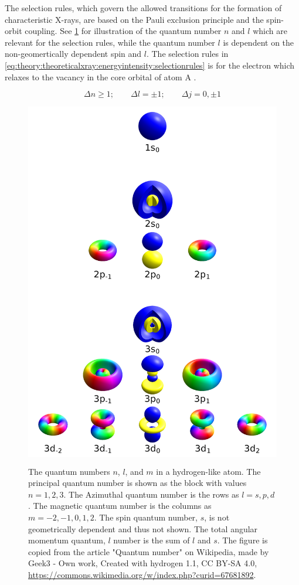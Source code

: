The selection rules, which govern the allowed transitions for the formation of characteristic X-rays, are based on the Pauli exclusion principle and the spin-orbit coupling.
See \cref{fig:theory:theoreticalxray:energyintensity:quantumnumbers} for illustration of the quantum number $n$ and $l$ which are relevant for the selection rules, while the quantum number $l$ is dependent on the non-geomertically dependent spin and $l$.
The selection rules in \cref{eq:theory:theoreticalxray:energyintensity:selectionrules} is for the electron which relaxes to the vacancy in the core orbital of atom A \cite[Sec. 8.2.2.2]{hollas_modern_2004}.

\begin{equation}
    \label{eq:theory:theoreticalxray:energyintensity:selectionrules}
    \Delta n \ge 1;\qquad \Delta l  = \pm 1;\qquad \Delta j = 0, \pm 1
\end{equation}

\begin{figure}
    \centering
    \colorbox{white}{\includegraphics[width=0.5\linewidth]{figures/wikipedia-quantum-numbers-n-l-j.png}}
    \caption{
        The quantum numbers $n$, $l$, and $m$ in a hydrogen-like atom.
        The principal quantum number is shown as the block with values $n= 1, 2, 3$.
        The Azimuthal quantum number is the rows as $l = s, p, d$.
        The magnetic quantum number is the columns as $m = -2, -1, 0, 1, 2 $.
        The spin quantum number, $s$, is not geometrically dependent and thus not shown.
        The total angular momentum quantum, $l$ number is the sum of $l$ and $s$.
        The figure is copied from the article "Quantum number" on Wikipedia, made by Geek3 - Own work, Created with hydrogen 1.1, CC BY-SA 4.0, \url{https://commons.wikimedia.org/w/index.php?curid=67681892}.
    }
    \label{fig:theory:theoreticalxray:energyintensity:quantumnumbers}
\end{figure}


